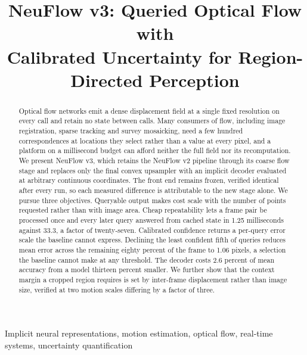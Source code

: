 \documentclass[conference]{IEEEtran}
\begin{document}
\title{NeuFlow v3: Queried Optical Flow with\\ Calibrated Uncertainty for
Region-Directed Perception}

\author{
}

\maketitle

\begin{abstract}
Optical flow networks emit a dense displacement field at a single fixed
resolution on every call and retain no state between calls. Many consumers of
flow, including image registration, sparse tracking and survey mosaicking, need a
few hundred correspondences at locations they select rather than a value at every
pixel, and a platform on a millisecond budget can afford neither the full field
nor its recomputation. We present NeuFlow v3, which retains the NeuFlow v2
pipeline through its coarse flow stage and replaces only the final convex
upsampler with an implicit decoder evaluated at arbitrary continuous coordinates.
The front end remains frozen, verified identical after every run, so each
measured difference is attributable to the new stage alone. We pursue three
objectives. Queryable output makes cost scale with the number of points requested
rather than with image area. Cheap repeatability lets a frame pair be processed
once and every later query answered from cached state in 1.25 milliseconds
against 33.3, a factor of twenty-seven. Calibrated confidence returns a per-query
error scale the baseline cannot express. Declining the least confident fifth of
queries reduces mean error across the remaining eighty percent of the frame to
1.06 pixels, a selection the baseline cannot make at any threshold. The decoder
costs 2.6 percent of mean accuracy from a model thirteen percent smaller. We
further show that the context margin a cropped region requires is set by
inter-frame displacement rather than image size, verified at two motion scales
differing by a factor of three.
\end{abstract}

\begin{IEEEkeywords}
Implicit neural representations, motion estimation, optical flow, real-time
systems, uncertainty quantification
\end{IEEEkeywords}
\end{document}
